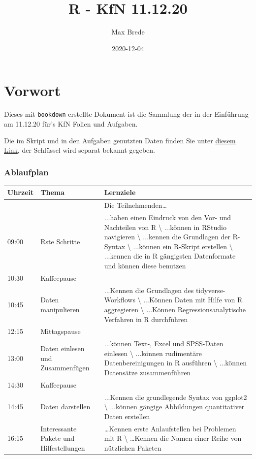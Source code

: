 \documentclass[
]{book}
\title{R - KfN 11.12.20}
\author{Max Brede}
\date{2020-12-04}
\begin{document}
\maketitle

{
\setcounter{tocdepth}{1}
\tableofcontents
}
\hypertarget{vorwort}{%
\chapter{Vorwort}\label{vorwort}}

Dieses mit \texttt{bookdown} erstellte Dokument ist die Sammlung der in der Einführung am 11.12.20 für's KfN Folien und Aufgaben.

Die im Skript und in den Aufgaben genutzten Daten finden Sie unter \href{https://mega.nz/folder/k2A0WZAZ}{diesem Link}, der Schlüssel wird separat bekannt gegeben.

\hypertarget{ablaufplan}{%
\subsection{Ablaufplan}\label{ablaufplan}}

\begin{tabular}{l|l|l}
\hline
Uhrzeit & Thema & Lernziele\\
\hline
 &  & Die Teilnehmenden…\\
\hline
09:00 & Rste Schritte & ...haben einen Eindruck von den Vor- und Nachteilen von R \textbackslash{}
 ...können in RStudio navigieren \textbackslash{}
 ...kennen die Grundlagen der R-Syntax \textbackslash{}
 ...können ein R-Skript erstellen \textbackslash{}
 ...kennen die in R gängigsten Datenformate und können diese benutzen\\
\hline
10:30 & Kaffeepause & \\
\hline
10:45 & Daten manipulieren & ...Kennen die Grundlagen des tidyverse-Workflows \textbackslash{}
 ...Können Daten mit Hilfe von R aggregieren \textbackslash{}
 ...Können Regressionsanalytische Verfahren in R durchführen\\
\hline
12:15 & Mittagspause & \\
\hline
13:00 & Daten einlesen und Zusammenfügen & ...können Text-, Excel und SPSS-Daten einlesen \textbackslash{}
 ...können rudimentäre Datenbereinigungen in R ausführen \textbackslash{}
 ...können Datensätze zusammenführen\\
\hline
14:30 & Kaffeepause & \\
\hline
14:45 & Daten darstellen & ...Kennen die grundlegende Syntax von ggplot2 \textbackslash{}
 ...können gängige Abbildungen quantitativer Daten erstellen\\
\hline
16:15 & Interessante Pakete und Hilfestellungen & …Kennen erste Anlaufstellen bei Problemen mit R \textbackslash{}
 …Kennen die Namen einer Reihe von nützlichen Paketen\\
\hline
\end{tabular}
\end{document}
